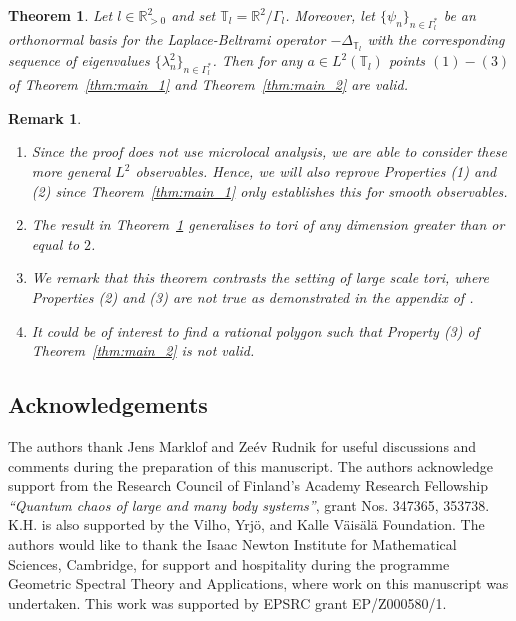 \documentclass[10pt,a4paper]{amsart}
\newcommand{\R}{\mathbb{R}}
\newcommand{\1}{\mathrm{\mathbf{1}}}
\numberwithin{equation}{section}
\newtheorem{theorem}[thm]{Theorem}
\newtheorem{remark}[thm]{Remark}
\begin{document}
\begin{theorem}
    \label{Thm:Main_theorem_tori}
    Let $l\in \R^2_{>0}$ and set $\mathbb{T}_{l} = \R^2 \big/ \Gamma_{l}$. Moreover, let $\{\psi_{n}\}_{n\in\Gamma_l^{*}}$ be an orthonormal basis for the Laplace-Beltrami operator $-\Delta_{\mathbb{T}_{l}}$ with the corresponding sequence of eigenvalues $\{\lambda_{n}^2\}_{n\in\Gamma_l^{*}}$. 
    Then for any $a\in L^2(\mathbb{T}_{l})$ points $(1)-(3)$ of Theorem~\ref{thm:main_1} and Theorem~\ref{thm:main_2} are valid.
\end{theorem}

\begin{remark}
$ $ \\ 
\vspace{-1em}
    \begin{enumerate}[label=\textnormal{(\roman*)}]
    \item Since the proof does not use microlocal analysis, we are able to consider these more general $L^2$ observables. Hence, we will also reprove Properties (1) and (2) since Theorem~\ref{thm:main_1} only establishes this for smooth observables.
    
    \item The result in Theorem~\ref{Thm:Main_theorem_tori} generalises to tori of any dimension greater than or equal to $2$.

    \item We remark that this theorem contrasts the setting of large scale tori, where Properties (2) and (3) are not true as demonstrated in the appendix of \cite{Hippi}.  

    \item It could be of interest to find a rational polygon such that Property (3) of Theorem~\ref{thm:main_2} is not valid.

    \end{enumerate}
\end{remark}

\subsection*{Acknowledgements} The authors thank Jens Marklof and Ze\'ev Rudnik for useful discussions and comments during the preparation of this manuscript. The authors acknowledge support from the Research Council of Finland's Academy Research Fellowship \emph{``Quantum chaos of large and many body systems''}, grant Nos. 347365, 353738. K.H. is also supported by the Vilho, Yrjö, and Kalle Väisälä Foundation. The authors would like to thank the Isaac Newton Institute for Mathematical Sciences, Cambridge, for support and hospitality during the programme Geometric Spectral Theory and Applications, where work on this manuscript was undertaken. This work was supported by EPSRC grant EP/Z000580/1.
\end{document}
